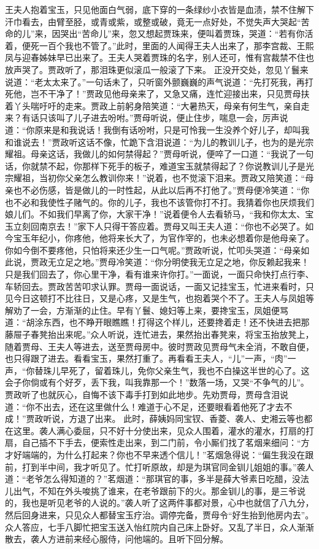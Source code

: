 \documentclass[12pt,oneside]{book}
\begin{document}
王夫人抱着宝玉，只见他面白气弱，底下穿的一条绿纱小衣皆是血渍，禁不住解下汗巾看去，由臂至胫，或青或紫，或整或破，竟无一点好处，不觉失声大哭起“苦命的儿”来，因哭出“苦命儿”来，忽又想起贾珠来，便叫着贾珠，哭道：“若有你活着，便死一百个我也不管了。”此时，里面的人闻得王夫人出来了，那李宫裁、王熙凤与迎春姊妹早已出来了。王夫人哭着贾珠的名字，别人还可，惟有宫裁禁不住也放声哭了。贾政听了，那泪珠更似滚瓜一般滚了下来。
正没开交处，忽见丫鬟来说道：“老太太来了。”一句话未了，只听窗外颤巍巍的声气说道：“先打死我，再打死他，岂不干净了！”贾政见他母亲来了，又急又痛，连忙迎接出来，只见贾母扶着丫头喘吁吁的走来。贾政上前躬身陪笑道：“大暑热天，母亲有何生气，亲自走来？有话只该叫了儿子进去吩咐。”贾母听说，便止住步，喘息一会，厉声说道：“你原来是和我说话！我倒有话吩咐，只是可怜我一生没养个好儿子，却叫我和谁说去！”贾政听这话不像，忙跪下含泪说道：“为儿的教训儿子，也为的是光宗耀祖。母亲这话，我做儿的如何禁得起？”贾母听说，便啐了一口道：“我说了一句话，你就禁不起，你那样下死手的板子，难道宝玉就禁得起了？你说教训儿子是光宗耀祖，当初你父亲怎么教训你来！”说着，也不觉滚下泪来。贾政又陪笑道：“母亲也不必伤感，皆是做儿的一时性起，从此以后再不打他了。”贾母便冷笑道：“你也不必和我使性子赌气的。你的儿子，我也不该管你打不打。我猜着你也厌烦我们娘儿们。不如我们早离了你，大家干净！”说着便令人去看轿马，“我和你太太、宝玉立刻回南京去！”家下人只得干答应着。贾母又叫王夫人道：“你也不必哭了。如今宝玉年纪小，你疼他，他将来长大了，为官作宰的，也未必想着你是他母亲了。你如今倒不要疼他，只怕将来还少生一口气呢。”贾政听说，忙叩头哭道：“母亲如此说，贾政无立足之地。”贾母冷笑道：“你分明使我无立足之地，你反赖起我来！只是我们回去了，你心里干净，看有谁来许你打。”一面说，一面只命快打点行李、车轿回去。贾政苦苦叩求认罪。贾母一面说话，一面又记挂宝玉，忙进来看时，只见今日这顿打不比往日，又是心疼，又是生气，也抱着哭个不了。王夫人与凤姐等解劝了一会，方渐渐的止住。早有丫鬟、媳妇等上来，要搀宝玉，凤姐便骂道：“胡涂东西，也不睁开眼瞧瞧！打得这个样儿，还要搀着走！还不快进去把那藤屉子春凳抬出来呢。”众人听说，连忙进去，果然抬出春凳来，将宝玉抬放凳上，随着贾母、王夫人等进去，送至贾母房中。彼时贾政见贾母气未全消，不敢自便，也只得跟了进去。看看宝玉，果然打重了。再看看王夫人，“儿”一声，“肉”一声，“你替珠儿早死了，留着珠儿，免你父亲生气，我也不白操这半世的心了。这会子你倘或有个好歹，丢下我，叫我靠那一个！”数落一场，又哭“不争气的儿”。贾政听了也就灰心，自悔不该下毒手打到如此地步。先劝贾母，贾母含泪说道：“你不出去，还在这里做什么！难道于心不足，还要眼看着他死了才去不成！”贾政听说，方退了出来。
此时，薛姨妈同宝钗、香菱、袭人、史湘云等也都在这里。袭人满心委屈，只不好十分使出来，见众人围着，灌水的灌水，打扇的打扇，自己插不下手去，便索性走出来，到二门前，令小厮们找了茗烟来细问：“方才好端端的，为什么打起来？你也不早来透个信儿！”茗烟急得说：“偏生我没在跟前，打到半中间，我才听见了。忙打听原故，却是为琪官同金钏儿姐姐的事。”袭人道：“老爷怎么得知道的？”茗烟道：“那琪官的事，多半是薛大爷素日吃醋，没法儿出气，不知在外头唆挑了谁来，在老爷跟前下的火。那金钏儿的事，是三爷说的，我也是听见老爷的人说的。”袭人听了这两件事都对景，心中也就信了八九分，然后回身进来，只见众人都替宝玉疗治。调停完备，贾母令“好生抬到他房内去”。众人答应，七手八脚忙把宝玉送入怡红院内自己床上卧好。又乱了半日，众人渐渐散去，袭人方进前来经心服侍，问他端的。且听下回分解。
\end{document}
